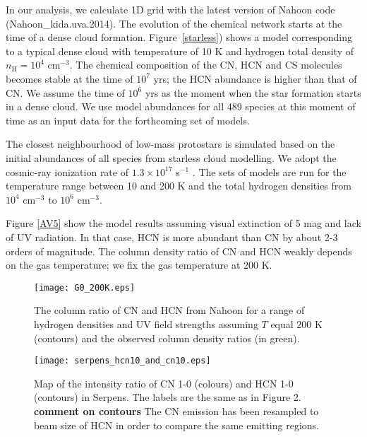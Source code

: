 \documentclass{aa}
\begin{document}
In our analysis, we calculate 1D grid with the latest version of Nahoon code (Nahoon\_kida.uva.2014). 
The evolution of the chemical network starts at the time of a dense cloud formation.
Figure~\ref{starless}) shows a model corresponding to a typical dense cloud with temperature of 10 K
and hydrogen total density of $n_\mathrm{H} = 10^4$ cm$^{-3}$. The chemical composition
of the CN, HCN and CS molecules becomes stable at the time of $10^{7}$ yrs; the HCN abundance is higher
than that of CN. We assume the time of $10^{6}$ yrs as the moment when the star formation starts in
a dense cloud. We use model abundances for all 489 species at this moment of time 
as an input data for the forthcoming set of models.

The closest neighbourhood of low-mass protostars is simulated based on the initial abundances of
all species from starless cloud modelling. We adopt the cosmic-ray ionization
rate of $1.3\times 10^{17}$ s$^{-1}$ \textbf{\citep{Cra78}}. The sets of models are run
for the temperature range between 10 and 200 K and the total hydrogen densities from $10^4$
cm$^{-3}$ to $10^6$ cm$^{-3}$. 

Figure \ref{AV5} show the model results assuming visual extinction of 5 mag and lack 
of UV radiation. In that case, HCN is more abundant than CN by about 2-3
orders of magnitude. The column density ratio of CN and HCN weakly depends on the 
gas temperature; we fix the gas temperature at 200 K.
\begin{figure} 
\centering 
\texttt{[image: G0\_200K.eps]} 
\caption{The column ratio of CN and HCN from Nahoon for a 
range of hydrogen densities and UV field strengths assuming $T$ equal 200 K (contours) 
and the observed column density ratios (in green).} 
\label{G0} 
\end{figure}
\begin{figure} 
\centering 
\texttt{[image: serpens\_hcn10\_and\_cn10.eps]}
\caption{Map of the intensity ratio of CN 1-0 (colours) and HCN 1-0
(contours) in Serpens. The labels are the same as in Figure 2. \textbf{comment on contours}
The CN emission has been resampled to beam size of HCN in order to compare the same emitting regions.} 
\label{cn10_and_hcn10} 
\end{figure}
\end{document}

